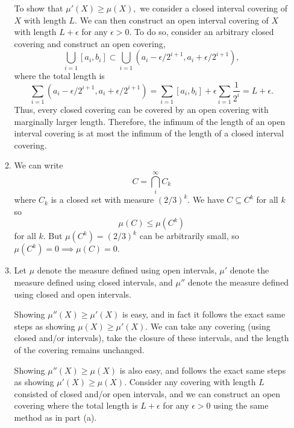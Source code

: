 \documentclass{article}
\numberwithin{equation}{section}
\begin{document}
\begin{enumerate}
\begin{enumerate}[label=(\alph*)]
        To show that $\mu'(X) \ge \mu(X),$ we consider a closed interval covering of $X$ with length $L.$ We can then construct an open interval covering of $X$ with length $L+\epsilon$ for any $\epsilon > 0.$ To do so, consider an arbitrary closed covering and construct an open covering,
        \begin{equation}
            \bigcup_{i=1} [a_i,b_i] \subset \bigcup_{i=1} (a_i-\epsilon/2^{i+1}, a_i+\epsilon/2^{i+1}),
        \end{equation}
        where the total length is
        \begin{equation}
            \sum_{i=1} (a_i-\epsilon/2^{i+1}, a_i+\epsilon/2^{i+1}) = \sum_{i=1} [a_i,b_i] + \epsilon \sum_{i=1} \frac{1}{2^{i}} = L + \epsilon.
        \end{equation}
        Thus, every closed covering can be covered by an open covering with marginally larger length. Therefore, the infimum of the length of an open interval covering is at most the infimum of the length of a closed interval covering.
        \item We can write 
        \begin{equation}
            C = \bigcap_i^{\infty} C_k
        \end{equation}
        where $C_k$ is a closed set with measure $(2/3)^k.$ We have $C \subseteq C^k$ for all $k$ so
        \begin{equation}
            \mu(C) \le \mu(C^k)
        \end{equation}
        for all $k.$ But $\mu(C^k)=(2/3)^k$ can be arbitrarily small, so $\mu(C^k)=0\implies \mu(C)=0.$
        \item Let $\mu$ denote the measure defined using open intervals, $\mu'$ denote the measure defined using closed intervals, and $\mu''$ denote the measure defined using closed and open intervals.
        
        Showing $\mu''(X) \ge \mu'(X)$ is easy, and in fact it follows the exact same steps as showing $\mu(X) \ge \mu'(X).$ We can take any covering (using closed and/or intervals), take the closure of these intervals, and the length of the covering remains unchanged.

        Showing $\mu''(X) \ge \mu(X)$ is also easy, and follows the exact same steps as showing $\mu'(X) \ge \mu(X).$ Consider any covering with length $L$ consisted of closed and/or open intervals, and we can construct an open covering where the total length is $L+\epsilon$ for any $\epsilon>0$ using the same method as in part (a). 


\end{enumerate}
\end{enumerate}
\end{document}
